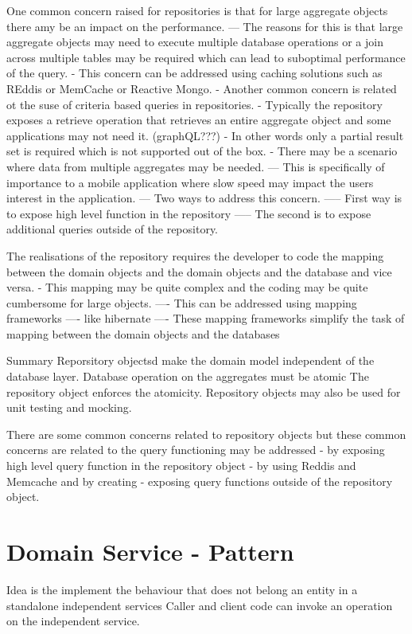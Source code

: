 One common concern raised for repositories is that for large aggregate objects there amy be an impact on the performance.
--- The reasons for this is that large aggregate objects may need to execute multiple database operations or a join across multiple tables may be required which can lead to suboptimal performance of the query.
- This concern can be addressed using caching solutions such as REddis or MemCache or Reactive Mongo.
- Another common concern is related ot the suse of criteria based queries in repositories.
- Typically the repository exposes a retrieve operation that retrieves an entire aggregate object and some applications may not need it. (graphQL???)
- In other words only a partial result set is required which is not supported out of the box.
- There may be a scenario where data from multiple aggregates may be needed.
--- This is specifically of importance to a mobile application where slow speed may impact the users interest in the application.
--- Two ways to address this concern.
----- First way is to expose high level function in the repository
----- The second is to expose additional queries outside of the repository.

The realisations of the repository requires the developer to code the mapping between the domain objects and the domain objects and the database and vice versa.
- This mapping may be quite complex and the coding may be quite cumbersome for large objects.
---- This can be addressed using mapping frameworks ---- like hibernate
---- These mapping frameworks simplify the task of mapping between the domain objects and the databases

Summary
Reporsitory objectsd make the domain model independent of the database layer.
Database operation on the aggregates must be atomic
The repository object enforces the atomicity.
Repository objects may also be used for unit testing and mocking.

There are some common concerns related to repository objects but these common concerns are related to the query functioning may be addressed
- by exposing high level query function in the repository object
- by using Reddis and Memcache and by creating
- exposing query functions outside of the repository object.


\section{Domain Service - Pattern}
Idea is the implement the behaviour that does not belong an entity in a standalone independent services
Caller and client code can invoke an operation on the independent service.

